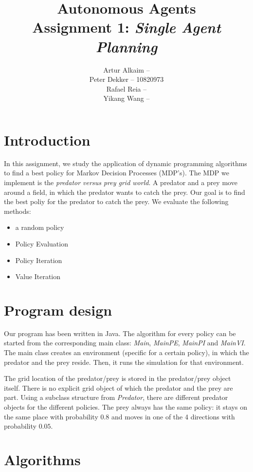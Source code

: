\documentclass{article}
\begin{document}
\title{Autonomous Agents\\
Assignment 1: \emph{Single Agent Planning}}
\author{
Artur Alkaim --\\
Peter Dekker -- 10820973\\
Rafael Reia --\\
Yikang Wang -- \\
}
\maketitle
\section{Introduction}
In this assignment, we study the application of dynamic programming algorithms to find a best policy for Markov Decision Processes (MDP's). The MDP we implement is the \emph{predator versus prey grid world}. A predator and a prey move around a field, in which the predator wants to catch the prey. Our goal is to find the best poliy for the predator to catch the prey. We evaluate the following methods:
\begin{itemize}
\item a random policy
\item Policy Evaluation
\item Policy Iteration
\item Value Iteration
\end{itemize}
\section{Program design}
Our program has been written in Java. The algorithm for every policy can be started from the corresponding main class: \emph{Main}, \emph{MainPE}, \emph{MainPI} and \emph{MainVI}. The main class creates an environment (specific for a certain policy), in which the predator and the prey reside. Then, it runs the simulation for that environment. 

The grid location of the predator/prey is stored in the predator/prey object itself. There is no explicit grid object of which the predator and the prey are part. Using a subclass structure from \emph{Predator}, there are different predator objects for the different policies. The prey always has the same policy: it stays on the same place with probability $0.8$ and moves in one of the 4 directions with probability $0.05$.
\section{Algorithms}
\end{document}
